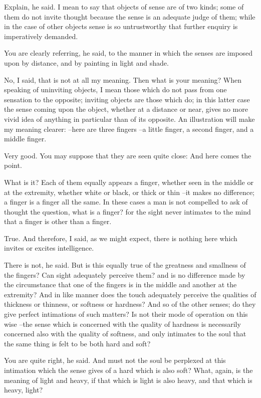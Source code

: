 Explain, he said.
I mean to say that objects of sense are of two kinds; some of them do not invite thought because the sense is an adequate judge of them; while in the case of other objects sense is so untrustworthy that further enquiry is imperatively demanded.

You are clearly referring, he said, to the manner in which the senses are imposed upon by distance, and by painting in light and shade.

No, I said, that is not at all my meaning.
Then what is your meaning?
When speaking of uninviting objects, I mean those which do not pass from one sensation to the opposite; inviting objects are those which do; in this latter case the sense coming upon the object, whether at a distance or near, gives no more vivid idea of anything in particular than of its opposite. An illustration will make my meaning clearer: --here are three fingers --a little finger, a second finger, and a middle finger.

Very good.
You may suppose that they are seen quite close: And here comes the point.

What is it?
Each of them equally appears a finger, whether seen in the middle or at the extremity, whether white or black, or thick or thin --it makes no difference; a finger is a finger all the same. In these cases a man is not compelled to ask of thought the question, what is a finger? for the sight never intimates to the mind that a finger is other than a finger.

True.
And therefore, I said, as we might expect, there is nothing here which invites or excites intelligence.

There is not, he said.
But is this equally true of the greatness and smallness of the fingers? Can sight adequately perceive them? and is no difference made by the circumstance that one of the fingers is in the middle and another at the extremity? And in like manner does the touch adequately perceive the qualities of thickness or thinness, or softness or hardness? And so of the other senses; do they give perfect intimations of such matters? Is not their mode of operation on this wise --the sense which is concerned with the quality of hardness is necessarily concerned also with the quality of softness, and only intimates to the soul that the same thing is felt to be both hard and soft?

You are quite right, he said.
And must not the soul be perplexed at this intimation which the sense gives of a hard which is also soft? What, again, is the meaning of light and heavy, if that which is light is also heavy, and that which is heavy, light?

